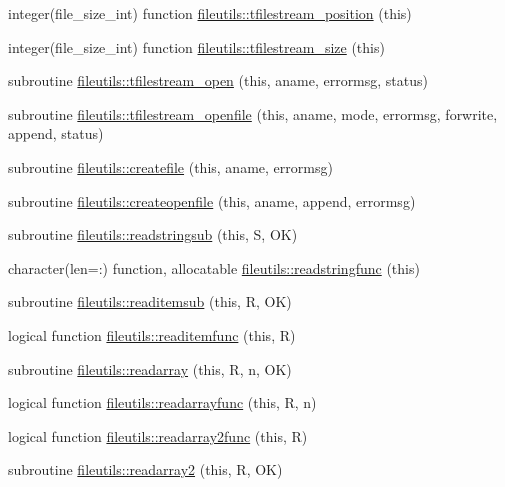 \begin{DoxyCompactItemize}
\item 
integer(file\+\_\+size\+\_\+int) function \mbox{\hyperlink{namespacefileutils_a3ee651544233289579c63ab2ffa3f6ce}{fileutils\+::tfilestream\+\_\+position}} (this)
\item 
integer(file\+\_\+size\+\_\+int) function \mbox{\hyperlink{namespacefileutils_ab4722eb4f85ef9a9326342dfcad3f0cc}{fileutils\+::tfilestream\+\_\+size}} (this)
\item 
subroutine \mbox{\hyperlink{namespacefileutils_a9b6ffe40088ad819c1e793b2bc91b01e}{fileutils\+::tfilestream\+\_\+open}} (this, aname, errormsg, status)
\item 
subroutine \mbox{\hyperlink{namespacefileutils_ae08cbb1a056e184eeab9c6a6a2181f24}{fileutils\+::tfilestream\+\_\+openfile}} (this, aname, mode, errormsg, forwrite, append, status)
\item 
subroutine \mbox{\hyperlink{namespacefileutils_a40850ce0c16a35137a51f9e4316d2599}{fileutils\+::createfile}} (this, aname, errormsg)
\item 
subroutine \mbox{\hyperlink{namespacefileutils_ae16c8e138a245fc238bc5e6d29b3415b}{fileutils\+::createopenfile}} (this, aname, append, errormsg)
\item 
subroutine \mbox{\hyperlink{namespacefileutils_a436d1ea1bb13200971bcbef4e268f503}{fileutils\+::readstringsub}} (this, S, OK)
\item 
character(len=\+:) function, allocatable \mbox{\hyperlink{namespacefileutils_a8b83c2f06ad952435c760ce789a1b01e}{fileutils\+::readstringfunc}} (this)
\item 
subroutine \mbox{\hyperlink{namespacefileutils_a520a8d58db5cabd4d1fcaf5fbf9eeb94}{fileutils\+::readitemsub}} (this, R, OK)
\item 
logical function \mbox{\hyperlink{namespacefileutils_a34cb445c075820131b56989e563c773c}{fileutils\+::readitemfunc}} (this, R)
\item 
subroutine \mbox{\hyperlink{namespacefileutils_a77d1826f1c337fc426cfbc7a8d2b642a}{fileutils\+::readarray}} (this, R, n, OK)
\item 
logical function \mbox{\hyperlink{namespacefileutils_a25c117441044cad4593a6e88245d59d2}{fileutils\+::readarrayfunc}} (this, R, n)
\item 
logical function \mbox{\hyperlink{namespacefileutils_abe905cf8167e2a6f36f2ddfcec24b6ad}{fileutils\+::readarray2func}} (this, R)
\item 
subroutine \mbox{\hyperlink{namespacefileutils_a1decdb16477082bdf6b48d9feb1accf7}{fileutils\+::readarray2}} (this, R, OK)

\end{DoxyCompactItemize}
